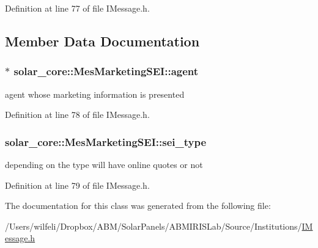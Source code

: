 Definition at line 77 of file I\+Message.\+h.



\subsection{Member Data Documentation}
\hypertarget{classsolar__core_1_1_mes_marketing_s_e_i_a5bc5eb8bf309e6ba96cfdc0feb01baa9}{}
\subsubsection[{agent}]{$\ast$ solar\+\_\+core\+::\+Mes\+Marketing\+S\+E\+I\+::agent}\label{classsolar__core_1_1_mes_marketing_s_e_i_a5bc5eb8bf309e6ba96cfdc0feb01baa9}
agent whose marketing information is presented 

Definition at line 78 of file I\+Message.\+h.

\hypertarget{classsolar__core_1_1_mes_marketing_s_e_i_a8897df83278137d8ff4b04c068e4370e}{}
\subsubsection[{sei\+\_\+type}]{ solar\+\_\+core\+::\+Mes\+Marketing\+S\+E\+I\+::sei\+\_\+type}\label{classsolar__core_1_1_mes_marketing_s_e_i_a8897df83278137d8ff4b04c068e4370e}
depending on the type will have online quotes or not 

Definition at line 79 of file I\+Message.\+h.



The documentation for this class was generated from the following file\+:\begin{DoxyCompactItemize}
\item 
/\+Users/wilfeli/\+Dropbox/\+A\+B\+M/\+Solar\+Panels/\+A\+B\+M\+I\+R\+I\+S\+Lab/\+Source/\+Institutions/\hyperlink{_i_message_8h}{I\+Message.\+h}\end{DoxyCompactItemize}
